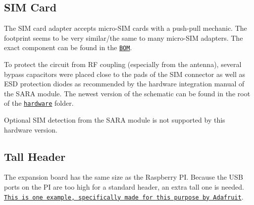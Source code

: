 \subsection*{S\+IM Card}

The S\+IM card adapter accepts micro-\/\+S\+IM cards with a push-\/pull mechanic. The footprint seems to be very similar/the same to many micro-\/\+S\+IM adapters. The exact component can be found in the \href{https://github.com/itsBelinda/ENG5220-2020-Team13/blob/master/hardware/PCBProduction/BEESAFE.BOM}{\tt {\ttfamily B\+OM}}.

To protect the circuit from RF coupling (especially from the antenna), several bypass capacitors were placed close to the pads of the S\+IM connector as well as E\+SD protection diodes as recommended by the hardware integration manual of the S\+A\+RA module. The newest version of the schematic can be found in the root of the \href{https://github.com/itsBelinda/ENG5220-2020-Team13/tree/master/hardware}{\tt {\ttfamily hardware}} folder.

Optional S\+IM detection from the S\+A\+RA module is not supported by this hardware version.

\subsection*{Tall Header}

The expansion board has the same size as the Raspberry PI. Because the U\+SB ports on the PI are too high for a standard header, an extra tall one is needed. \href{https://www.adafruit.com/product/1992}{\tt {\ttfamily This is one example, specifically made for this purpose by Adafruit}}. 